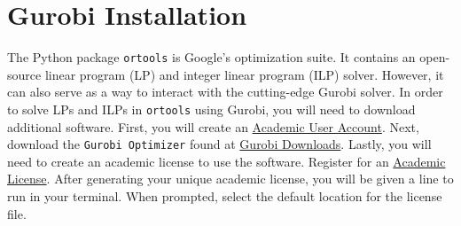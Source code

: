 \documentclass[11 pt]{article}
\begin{document}
\newpage

\section{Gurobi Installation}

The Python package \texttt{ortools} is Google's optimization suite. It contains an open-source linear program (LP) and integer linear program (ILP) solver. However, it can also serve as a way to interact with the cutting-edge Gurobi solver. In order to solve LPs and ILPs in \texttt{ortools} using Gurobi, you will need to download additional software. First, you will create an \href{https://pages.gurobi.com/registration}{Academic User Account}. Next, download the \texttt{Gurobi Optimizer} found at \href{https://www.gurobi.com/downloads/}{Gurobi Downloads}. Lastly, you will need to create an academic license to use the software. Register for an \href{https://www.gurobi.com/downloads/end-user-license-agreement-academic/}{Academic License}. After generating your unique academic license, you will be given a line to run in your terminal. When prompted, select the default location for the license file.


\begin{center}
\end{center}
\begin{center}
\end{center}
\end{document}
